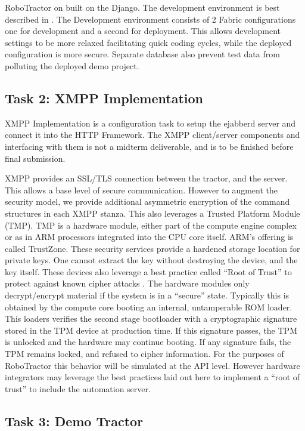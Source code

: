 \documentclass[conference,12pt]{IEEEtran}
\begin{document}
RoboTractor on built on the Django. The development environment is best
described in \autocite{_django_2014}. The Development environment consists of
2 Fabric configurations one for development and a second for deployment. This
  allows development settings to be more relaxed facilitating quick coding
  cycles, while the deployed configuration is more secure. Separate database
  also prevent test data from polluting the deployed demo project.

\subsection{Task 2: XMPP Implementation}
\label{sec:xmpp}
XMPP Implementation is a configuration task to setup the ejabberd server and
connect it into the HTTP Framework. The XMPP client/server components and
interfacing with them is not a midterm deliverable, and is to be finished before
final submission.

XMPP provides an SSL/TLS connection between the tractor, and the server. This
allows a base level of secure communication.  However to augment the security
model, we provide additional asymmetric encryption of the command structures
in each XMPP stanza.  This also leverages a Trusted Platform
Module (TMP). TMP is a hardware module, either part of the compute engine
complex or as in ARM processors integrated into the CPU core itself.  ARM's
offering is called TrustZone.  These security services provide a hardened
storage location for private keys.  One cannot extract the key without
destroying the device, and the key itself.  These devices also leverage a best
practice called ``Root of Trust'' to protect against known cipher attacks
\autocite{_tpm_2013}.  The
hardware modules only decrypt/encrypt material if the system is in a ``secure''
state.  Typically this is obtained by the compute core booting an internal,
untamperable ROM loader.  This loaders verifies the second stage bootloader with
a cryptographic signature stored in the TPM device at production time. If this
signature passes, the TPM is unlocked and the hardware may continue booting. If
any signature fails, the TPM remains locked, and refused to cipher information.
For the purposes of RoboTractor this behavior will be simulated at the API
level.  However hardware integrators may leverage the best practices laid out
here to implement a ``root of trust'' to include the automation server.  

\subsection{Task 3: Demo Tractor}
\end{document}
